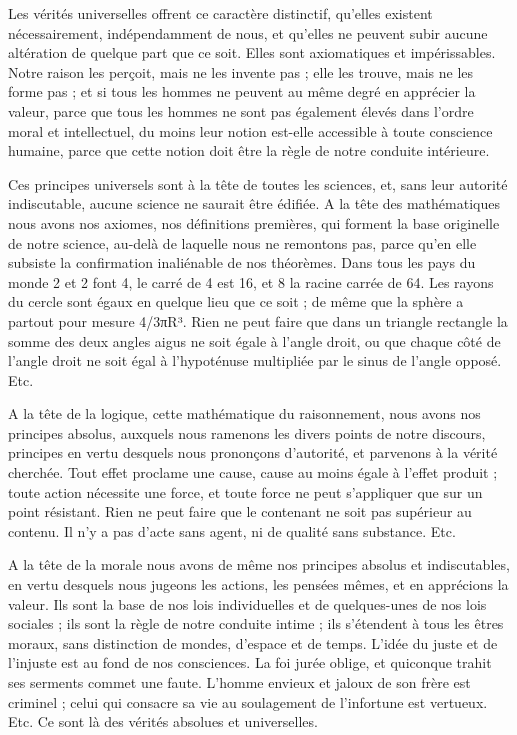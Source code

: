\documentclass[a4paper, 11pt, oneside]{article}
\begin{document}
Les vérités universelles offrent ce caractère distinctif, qu'elles existent nécessairement, indépendamment de nous, et qu'elles ne peuvent subir aucune altération de quelque part que ce soit. Elles sont axiomatiques et impérissables. Notre raison les perçoit, mais ne les invente pas ; elle les trouve, mais ne les forme pas ; et si tous les hommes ne peuvent au même degré en apprécier la valeur, parce que tous les hommes ne sont pas également élevés dans l'ordre moral et intellectuel, du moins leur notion est-elle accessible à toute conscience humaine, parce que cette notion doit être la règle de notre conduite intérieure.

Ces principes universels sont à la tête de toutes les sciences, et, sans leur autorité indiscutable, aucune science ne saurait être édifiée. A la tête des mathématiques nous avons nos axiomes, nos définitions premières, qui forment la base originelle de notre science, au-delà de laquelle nous ne remontons pas, parce qu'en elle subsiste la confirmation inaliénable de nos théorèmes. Dans tous les pays du monde 2 et 2 font 4, le carré de 4 est 16, et 8 la racine carrée de 64. Les rayons du cercle sont égaux en quelque lieu que ce soit ; de même que la sphère a partout pour mesure 4/3πR³. Rien ne peut faire que dans un triangle rectangle la somme des deux angles aigus ne soit égale à l'angle droit, ou que chaque côté de l'angle droit ne soit égal à l'hypoténuse multipliée par le sinus de l'angle opposé. Etc.

A la tête de la logique, cette mathématique du raisonnement, nous avons nos principes absolus, auxquels nous ramenons les divers points de notre discours, principes en vertu desquels nous prononçons d'autorité, et parvenons à la vérité cherchée. Tout effet proclame une cause, cause au moins égale à l'effet produit ; toute action nécessite une force, et toute force ne peut s'appliquer que sur un point résistant. Rien ne peut faire que le contenant ne soit pas supérieur au contenu. Il n'y a pas d'acte sans agent, ni de qualité sans substance. Etc.

A la tête de la morale nous avons de même nos principes absolus et indiscutables, en vertu desquels nous jugeons les actions, les pensées mêmes, et en apprécions la valeur. Ils sont la base de nos lois individuelles et de quelques-unes de nos lois sociales ; ils sont la règle de notre conduite intime ; ils s'étendent à tous les êtres moraux, sans distinction de mondes, d'espace et de temps. L'idée du juste et de l'injuste est au fond de nos consciences. La foi jurée oblige, et quiconque trahit ses serments commet une faute. L'homme envieux et jaloux de son frère est criminel ; celui qui consacre sa vie au soulagement de l'infortune est vertueux. Etc. Ce sont là des vérités absolues et universelles.
\end{document}
